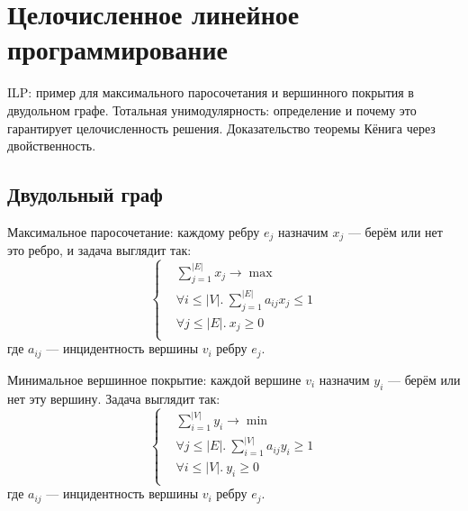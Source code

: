 \section{Целочисленное линейное программирование}
ILP: пример для максимального паросочетания
и вершинного покрытия в двудольном графе.
Тотальная унимодулярность:
определение и почему это гарантирует целочисленность решения.
Доказательство теоремы Кёнига через двойственность.

\subsection{Двудольный граф}
Максимальное паросочетание:
каждому ребру $e_j$ назначим $x_j$
--- берём или нет это ребро,
и задача выглядит так:
\[
    \left\{
        \begin{aligned}
            & \sum_{j=1}^{|E|} x_j \to \max \\
            & \forall i \le |V|.~\sum_{j=1}^{|E|} a_{ij} x_j \le 1 \\
            & \forall j \le |E|.~x_j \ge 0 \\
        \end{aligned}
    \right.
\]
где $a_{ij}$ --- инцидентность вершины $v_i$ ребру $e_j$.

Минимальное вершинное покрытие:
каждой вершине $v_i$ назначим $y_i$
--- берём или нет эту вершину.
Задача выглядит так:
\[
    \left\{
        \begin{aligned}
            & \sum_{i=1}^{|V|} y_i \to \min \\
            & \forall j \le |E|.~\sum_{i=1}^{|V|} a_{ij} y_i \ge 1 \\
            & \forall i \le |V|.~y_i \ge 0 \\
        \end{aligned}
    \right.
\]
где $a_{ij}$ --- инцидентность вершины $v_i$ ребру $e_j$.

